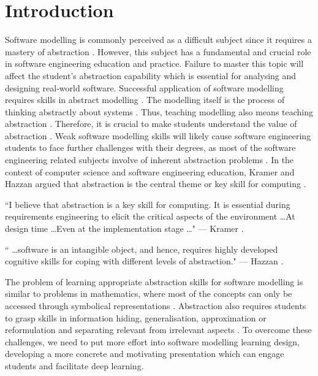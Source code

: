 \documentclass[12pt, a4paper]{report}
\begin{document}
\tableofcontents
{}

\chapter{Introduction}

Software modelling is commonly perceived as a difficult subject since it requires a mastery of abstraction \cite{Borstler2012}. However, this subject has a fundamental and crucial role in software engineering education and practice. Failure to master this topic will affect the student’s abstraction capability which is essential for analysing and designing real-world software. Successful application of software modelling requires skills in abstract modelling \cite{whittle2013industrial}. The modelling itself is the process of thinking abstractly about systems \cite{bezivin2009teaching}. Thus, teaching modelling also means teaching abstraction \cite{engels2005teaching}. Therefore, it is crucial to make students understand the value of abstraction \cite{bezivin2009teaching}. Weak software modelling skills will likely cause software engineering students to face further challenges with their degrees, as most of the software engineering related subjects involve of inherent abstraction problems \cite{Kramer2007}. In the context of computer science and software engineering education, Kramer and Hazzan argued that abstraction is the central theme or key skill for computing \cite{Kramer2007, hazzan2008reflections}.

\begin{displayquote}
``I believe that abstraction is a key skill for computing. It is essential during requirements engineering to elicit the critical aspects of the environment \dots At design time \dots Even at the implementation stage \dots " --- Kramer \cite{Kramer2007}.
\end{displayquote}

\begin{displayquote}
`` \dots software is an intangible object, and hence, requires highly developed cognitive skills for coping with different levels of abstraction." --- Hazzan \cite{hazzan2008reflections}.
\end{displayquote}

The problem of learning appropriate abstraction skills for software modelling is similar to problems in mathematics, where most of the concepts can only be accessed through symbolical representations \cite{Duval2006}. Abstraction also requires students to grasp skills in information hiding, generalisation, approximation or reformulation and separating relevant from irrelevant aspects \cite{Saitta2013}. To overcome these challenges, we need to put more effort into software modelling learning design, developing a more concrete and motivating presentation which can engage students and facilitate deep learning.
\end{document}

